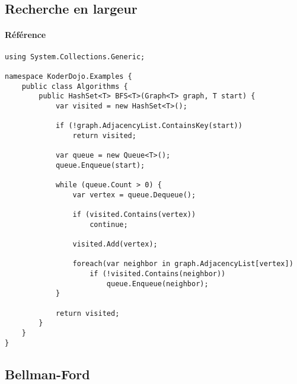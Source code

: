 \newpage
\subsection{Recherche en largeur}
\paragraph{Référence} \cite{Algorithm1}
\begin{lstlisting}
using System.Collections.Generic;

namespace KoderDojo.Examples {
    public class Algorithms {
        public HashSet<T> BFS<T>(Graph<T> graph, T start) {
            var visited = new HashSet<T>();

            if (!graph.AdjacencyList.ContainsKey(start))
                return visited;
                
            var queue = new Queue<T>();
            queue.Enqueue(start);

            while (queue.Count > 0) {
                var vertex = queue.Dequeue();

                if (visited.Contains(vertex))
                    continue;

                visited.Add(vertex);

                foreach(var neighbor in graph.AdjacencyList[vertex])
                    if (!visited.Contains(neighbor))
                        queue.Enqueue(neighbor);
            }

            return visited;
        }
    }
}
\end{lstlisting}

\newpage
\subsection{Bellman-Ford}
